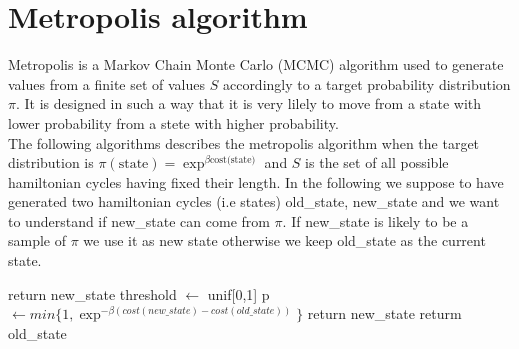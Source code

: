 \documentclass{article}
\begin{document}
\section{Metropolis algorithm}
Metropolis is a Markov Chain Monte Carlo (MCMC) algorithm used to generate values from a finite set of values $S$ accordingly to a target probability distribution $\pi$. It is designed in such a way that it is very lilely to move from a state with lower probability from a stete with higher probability. \\
The following algorithms describes the metropolis algorithm when the target distribution is $\pi(\text{state}) = \exp^{\beta \text{cost(state)}}$ and $S$ is the set of all possible hamiltonian cycles having fixed their length. In the following we suppose to have generated two hamiltonian cycles (i.e states) old\_state, new\_state and we want to understand if new\_state can come from $\pi$. If new\_state is likely to be a sample of $\pi$ we use it as new state otherwise we keep old\_state as the current state.
\begin{algorithm}[H]
    \begin{algorithmic}[1]
      	\State return new\_state
      	\EndIf
        \State threshold $\leftarrow$ unif[0,1]
        \State p  $\leftarrow min\{1,\exp^{- \beta (cost(new\_state) - cost(old\_state))} \}$ 
        	\State return new\_state
        \Else
        	\State returm old\_state
        \EndIf
       \EndFunction
\end{algorithmic}
\end{algorithm}
\noindent
\end{document}
